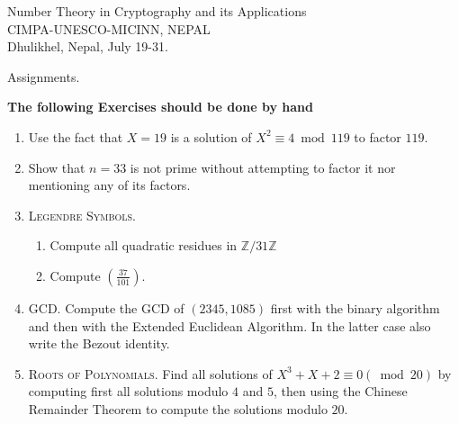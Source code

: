 \documentclass[a4paper]{scrartcl}
\title{}
\author{silvia pappalardi}
\date{\today}
\begin{document}
\begin{center}
Number Theory in Cryptography and its Applications\\
CIMPA-UNESCO-MICINN, NEPAL\\
Dhulikhel, Nepal, July 19-31.
\end{center}
\centerline{Assignments.}
\thispagestyle{empty}
\noindent\textbf{The following Exercises should be done by hand}
\begin{enumerate}
		\item Use the fact that $X=19$ is a solution of $X^2\equiv4\bmod 119$ to factor $119$.
		\item Show that $n=33$ is not prime without attempting to factor it nor mentioning any of its factors. 
		\item \textsc{Legendre Symbols.} \begin{enumerate}
			\item Compute all quadratic residues in $\mathbb Z/31\mathbb Z$
			\item Compute $\left(\frac{37}{101}\right)$.
		\end{enumerate}
		\item \textsc{GCD.} Compute the GCD of $(2345,1085)$ first with the binary algorithm and then
with the Extended Euclidean Algorithm. In the latter case also write the Bezout identity.
		\item \textsc{Roots of Polynomials.} 
Find all solutions of $X^3+X+2\equiv0(\bmod 20)$ by computing first all solutions modulo $4$ and $5$, then
using the Chinese Remainder Theorem to compute the solutions modulo $20$.
\end{enumerate}	
\end{document}
